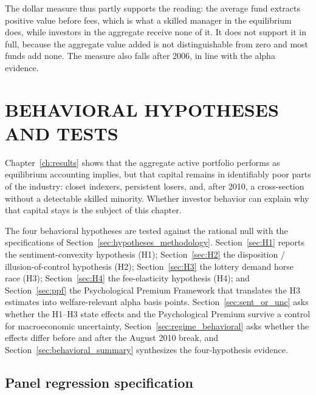 \documentclass[12pt, oneside]{report}
\begin{document}
The dollar measure thus partly supports the
\textcite{BerkVanBinsbergen2015} reading: the average fund extracts
positive value before fees, which is what a skilled manager in the
\textcite{BerkGreen2004} equilibrium does, while investors in the
aggregate receive none of it. It does not support it in full, because
the aggregate value added is not distinguishable from zero and most
funds add none. The measure also falls after 2006, in line with the
alpha evidence.

\chapter{BEHAVIORAL HYPOTHESES AND TESTS}
\label{ch:behavioral}

\noindent Chapter~\ref{ch:results} shows that the aggregate active
portfolio performs as equilibrium accounting implies, but that capital
remains in identifiably poor parts of the industry: closet indexers,
persistent losers, and, after 2010, a cross-section without a detectable
skilled minority. Whether investor behavior can explain why that capital
stays is the subject of this chapter.

The four behavioral hypotheses are tested against the
\textcite{BerkGreen2004} rational null with the specifications of
Section~\ref{sec:hypotheses_methodology}. Section~\ref{sec:H1} reports the sentiment-convexity
hypothesis (H1); Section~\ref{sec:H2} the disposition /
illusion-of-control hypothesis (H2); Section~\ref{sec:H3} the lottery
demand horse race (H3); Section~\ref{sec:H4} the fee-elasticity
hypothesis (H4); and Section~\ref{sec:ppf} the Psychological Premium
Framework that translates the H3 estimates into welfare-relevant alpha
basis points. Section~\ref{sec:sent_or_unc} asks whether the H1--H3 state effects
and the Psychological Premium survive a control for macroeconomic
uncertainty, Section~\ref{sec:regime_behavioral} asks whether the effects
differ before and after the August 2010 break, and
Section~\ref{sec:behavioral_summary} synthesizes the four-hypothesis
evidence.

\section{Panel regression specification}
\label{sec:panel_spec}
\end{document}
